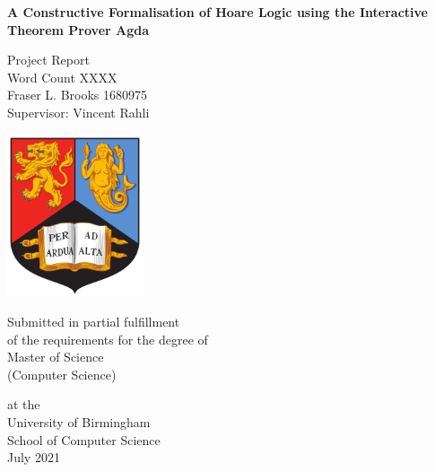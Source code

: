 \documentclass[oneside,12pt]{article}
\begin{document}
\begin{titlepage}
  \begin{center}
    \large

    \textbf{\Large A Constructive Formalisation of Hoare Logic using the Interactive Theorem Prover Agda}
    
    \vfill

    Project Report \\
    Word Count XXXX   \\
    Fraser L. Brooks 1680975 \\
    Supervisor: Vincent Rahli
    
    \vfill
    \includegraphics[width=4cm]{Figures/birmingham_shield.png}
    \vfill
       
    Submitted in partial fulfillment \\
    of the requirements for the degree of\\
    Master of Science \\
    (Computer Science) \\
       
    \vfill
       
    at the \\
    University of Birmingham\\
    School of Computer Science\\
    July 2021
       
    \vspace{0.8cm}
       
  \end{center}
\end{titlepage}

\flushbottom
\end{document}
